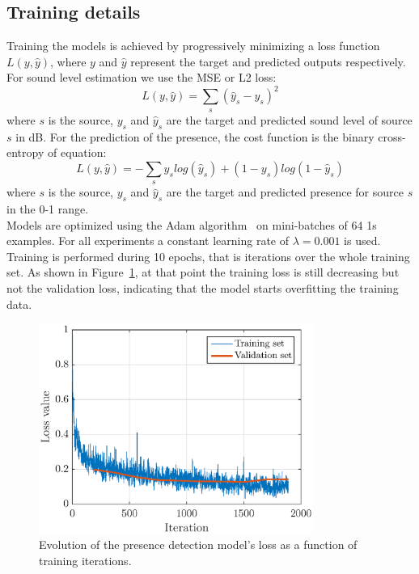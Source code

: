 \documentclass[11pt,a4paper]{article}
\begin{document}
\subsection{Training details}
\label{sec:pred_train}


Training the models is achieved by progressively minimizing a loss function $L(y, \hat y)$, where $y$ and $\hat y$ represent the target and predicted outputs respectively. For sound level estimation we use the MSE or L2 loss:
\begin{equation}
L(y, \hat y) = \sum_s \left(\hat y_s - y_s\right)^2
\end{equation}
where $s$ is the source, $y_s$ and $\hat y_s$ are the target and predicted sound level of source $s$ in dB. For the prediction of the presence, the cost function is the binary cross-entropy of equation:
\begin{equation}
L(y, \hat y) = -\sum_s y_s log\left(\hat y_s\right) + (1-y_s) log\left(1-\hat y_s\right)
\end{equation}
where $s$ is the source, $y_s$ and $\hat y_s$ are the target and predicted presence for source $s$ in the 0-1 range.\\

Models are optimized using the Adam algorithm~\cite{kingma2015} on mini-batches of 64 1s examples. For all experiments a constant learning rate of $\lambda = 0.001$ is used. Training is performed during 10 epochs, that is iterations over the whole training set. As shown in Figure~\ref{fig:mdl_loss}, at that point the training loss is still decreasing but not the validation loss, indicating that the model starts overfitting the training data.

\begin{figure}[!h]
    \centering
    \includegraphics[width=0.8\textwidth]{figures/mdl_loss.eps}
    \caption{Evolution of the presence detection model's loss as a function of training iterations.}\label{fig:mdl_loss}
\end{figure}
\end{document}
